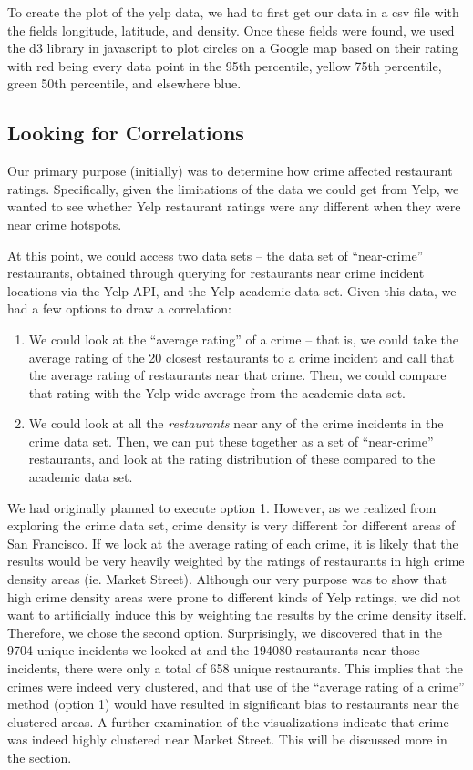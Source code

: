 \documentclass{article}
\begin{document}
To create the plot of the yelp data, we had to first get our data in a csv
file with the fields longitude, latitude, and density. Once these fields
were found, we used the d3 library in javascript to plot circles on a
Google map based on their rating with red being every data point in the
95th percentile, yellow 75th percentile, green 50th percentile, and
elsewhere blue.

\subsection{Looking for Correlations}

Our primary purpose (initially) was to determine how crime affected
restaurant ratings. Specifically, given the limitations of the data we
could get from Yelp, we wanted to see whether Yelp restaurant ratings were
any different when they were near crime hotspots.

At this point, we could access two data sets -- the data set of
``near-crime'' restaurants, obtained through querying for restaurants near
crime incident locations via the Yelp API, and the Yelp academic data
set. Given this data, we had a few options to draw a correlation:
\begin{enumerate}
\item We could look at the ``average rating'' of a crime -- that is, we
  could take the average rating of the 20 closest restaurants to a crime
  incident and call that the average rating of restaurants near that
  crime. Then, we could compare that rating with the Yelp-wide average from
  the academic data set.
\item We could look at all the \textit{restaurants} near any of the crime
  incidents in the crime data set. Then, we can put these together as a set
  of ``near-crime'' restaurants, and look at the rating distribution of
  these compared to the academic data set.
\end{enumerate}
We had originally planned to execute option 1. However, as we realized from
exploring the crime data set, crime density is very different for different
areas of San Francisco. If we look at the average rating of each crime, it
is likely that the results would be very heavily weighted by the ratings of
restaurants in high crime density areas (ie. Market Street). Although our
very purpose was to show that high crime density areas were prone to
different kinds of Yelp ratings, we did not want to artificially induce
this by weighting the results by the crime density itself. Therefore, we
chose the second option. Surprisingly, we discovered that in the 9704
unique incidents we looked at and the 194080 restaurants near those
incidents, there were only a total of 658 unique restaurants. This implies
that the crimes were indeed very clustered, and that use of the ``average
rating of a crime'' method (option 1) would have resulted in significant
bias to restaurants near the clustered areas. A further examination of the
visualizations indicate that crime was indeed highly clustered near Market
Street. This will be discussed more in the \textbf{}
section.
\end{document}
